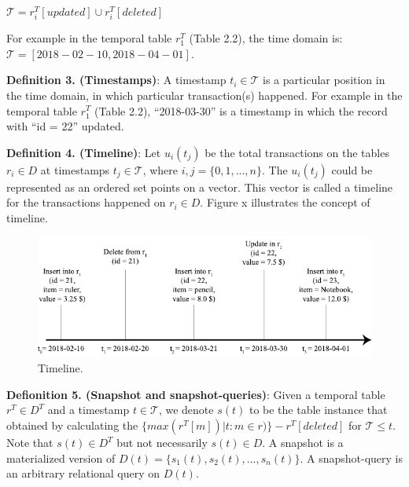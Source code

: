 \begin{center}
	$\mathcal{T} = r_i^T[updated] \cup r_i^T[deleted]$
\end{center}
For example in the temporal table $r_1^T$ (Table 2.2), the time domain is:
$\mathcal{T} = [2018-02-10,2018-04-01]$.

\textbf{Definition 3. (Timestamps)}: A timestamp $t_i \in \mathcal{T}$ is a particular position in the time domain, in which particular transaction(s) happened. For example in the temporal table $r_1^T$ (Table 2.2), ``2018-03-30'' is a timestamp in which the record with ``id = 22'' updated.

\textbf{Definition 4. (Timeline)}: Let $u_i(t_j)$ be the total transactions on the tables $r_i \in D$ at timestamps $t_j \in \mathcal{T}$, where $i,j=\{0,1,...,n\}$. The $u_i(t_j)$ could be represented as an ordered set points on a vector. This vector is called a timeline for the transactions happened on $r_i \in D$. Figure x illustrates the concept of timeline.
\begin{figure}
	\label{fig:timeline}
	\centering
	\includegraphics[width=\textwidth]{figs/timeline.pdf}
	\caption{Timeline.}
\end{figure}

\textbf{Defionition 5. (Snapshot and snapshot-queries)}: Given a temporal table $r^T \in D^T$ and a timestamp $t \in \mathcal{T}$, we denote $s(t)$ to be the table instance that obtained by calculating the $\{max(r^T[m])|t : m\in r)\}-r^T[deleted]$ for $\mathcal{T}\leq t$. Note that $s(t) \in D^T$ but not necessarily $s(t) \in D$. A snapshot is a materialized version of $D(t) = \{s_1(t),s_2(t),...,s_n(t)\}$. A snapshot-query is an arbitrary relational query on $D(t)$.

